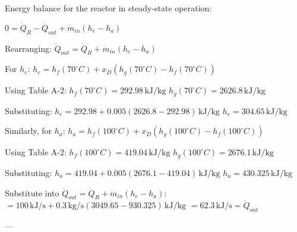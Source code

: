 Energy balance for the reactor in steady-state operation:  

\( 0 = \dot{Q}_R - \dot{Q}_{out} + \dot{m}_{in}(h_e - h_a) \)  

Rearranging:  
\( \dot{Q}_{out} = \dot{Q}_R + \dot{m}_{in}(h_e - h_a) \)  

For \( h_e \):  
\( h_e = h_f(70^\circ C) + x_D(h_g(70^\circ C) - h_f(70^\circ C)) \)  

Using Table A-2:  
\( h_f(70^\circ C) = 292.98 \, \text{kJ/kg} \)  
\( h_g(70^\circ C) = 2626.8 \, \text{kJ/kg} \)  

Substituting:  
\( h_e = 292.98 + 0.005(2626.8 - 292.98) \, \text{kJ/kg} \)  
\( h_e = 304.65 \, \text{kJ/kg} \)  

Similarly, for \( h_a \):  
\( h_a = h_f(100^\circ C) + x_D(h_g(100^\circ C) - h_f(100^\circ C)) \)  

Using Table A-2:  
\( h_f(100^\circ C) = 419.04 \, \text{kJ/kg} \)  
\( h_g(100^\circ C) = 2676.1 \, \text{kJ/kg} \)  

Substituting:  
\( h_a = 419.04 + 0.005(2676.1 - 419.04) \, \text{kJ/kg} \)  
\( h_a = 430.325 \, \text{kJ/kg} \)

Substitute into \( \dot{Q}_{out} = \dot{Q}_R + \dot{m}_{in} (h_e - h_a) \):  
\( = 100 \, \text{kJ/s} + 0.3 \, \text{kg/s} \left( 3049.65 - 930.325 \right) \, \text{kJ/kg} \)  
\( = 62.3 \, \text{kJ/s} = \dot{Q}_{out} \)  

---